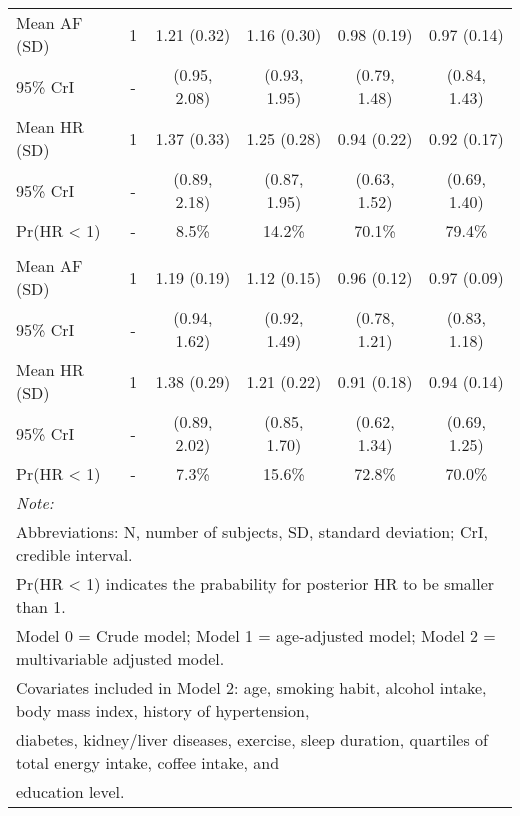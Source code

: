 \documentclass[nutrients,article,submitted,moreauthors,pdftex]{Definitions/mdpi}
\begin{document}
\begin{table}[H]
{\begin{tabular}[t]{lccccc}
\rowcolor{gray!6}  \hspace{1em}Mean AF (SD) & 1 & 1.21 (0.32) & 1.16 (0.30) & 0.98 (0.19) & 0.97 (0.14)\\
\hspace{1em}95\% CrI & - & (0.95, 2.08) & (0.93, 1.95) & (0.79, 1.48) & (0.84, 1.43)\\
\rowcolor{gray!6}  \hspace{1em}Mean HR (SD) & 1 & 1.37 (0.33) & 1.25 (0.28) & 0.94 (0.22) & 0.92 (0.17)\\
\hspace{1em}95\% CrI & - & (0.89, 2.18) & (0.87, 1.95) & (0.63, 1.52) & (0.69, 1.40)\\
\rowcolor{gray!6}  \hspace{1em}Pr(HR < 1) & - & 8.5\% & 14.2\% & 70.1\% & 79.4\%\\
\addlinespace[0.3em]
\multicolumn{6}{l}{\textbf{Model 2}}\\
\hspace{1em}Mean AF (SD) & 1 & 1.19 (0.19) & 1.12 (0.15) & 0.96 (0.12) & 0.97 (0.09)\\
\rowcolor{gray!6}  \hspace{1em}95\% CrI & - & (0.94, 1.62) & (0.92, 1.49) & (0.78, 1.21) & (0.83, 1.18)\\
\hspace{1em}Mean HR (SD) & 1 & 1.38 (0.29) & 1.21 (0.22) & 0.91 (0.18) & 0.94 (0.14)\\
\rowcolor{gray!6}  \hspace{1em}95\% CrI & - & (0.89, 2.02) & (0.85, 1.70) & (0.62, 1.34) & (0.69, 1.25)\\
\hspace{1em}Pr(HR < 1) & - & 7.3\% & 15.6\% & 72.8\% & 70.0\%\\
\bottomrule
\multicolumn{6}{l}{\textit{Note: }}\\
\multicolumn{6}{l}{Abbreviations: N, number of subjects, SD, standard deviation; CrI, credible interval.}\\
\multicolumn{6}{l}{ Pr(HR < 1) indicates the prabability for posterior HR to be smaller than 1.}\\
\multicolumn{6}{l}{Model 0 = Crude model; Model 1 = age-adjusted model; Model 2 = multivariable adjusted model.}\\
\multicolumn{6}{l}{Covariates included in Model 2: age, smoking habit, alcohol intake, body mass index, history of hypertension, }\\
\multicolumn{6}{l}{diabetes, kidney/liver diseases, exercise, sleep duration,  quartiles of total energy intake, coffee intake, and }\\
\multicolumn{6}{l}{education level.}\\
\end{tabular}}
\end{table}
\end{document}
